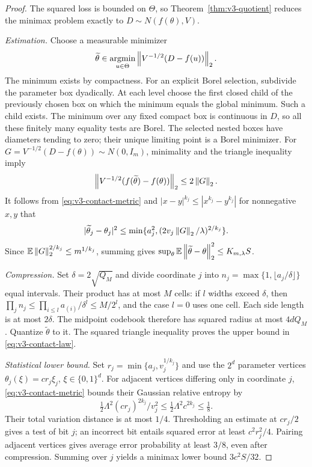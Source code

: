 \begin{proof}
The squared loss is bounded on $\Theta$, so
Theorem~\ref{thm:v3-quotient} reduces the minimax problem exactly to
$D\sim N(f(\theta),V)$.

\emph{Estimation.} Choose a measurable minimizer
\[
 \widetilde\theta\in\operatorname*{argmin}_{u\in\Theta}
          \left\lVert V^{-1/2}(D-f(u))\right\rVert_2.
\]
The minimum exists by compactness. For an explicit Borel selection,
subdivide the parameter box dyadically. At each level choose the first
closed child of the previously chosen box on which the minimum equals
the global minimum. Such a child exists. The minimum over any fixed
compact box is continuous in $D$, so all these finitely many equality
tests are Borel. The selected nested boxes have diameters tending to zero;
their unique limiting point is a Borel minimizer. For $G=V^{-1/2}(D-f(\theta))\sim N(0,I_m)$,
minimality and the triangle inequality imply
\[
 \left\lVert V^{-1/2}(f(\widetilde\theta)-f(\theta))\right\rVert_2\le2\left\lVert G\right\rVert_2.
\]
It follows from \eqref{eq:v3-contact-metric} and
$|x-y|^{k_j}\le|x^{k_j}-y^{k_j}|$ for nonnegative $x,y$ that
\[
 |\widetilde\theta_j-\theta_j|^2
 \le\min\{a_j^2,(2v_j\left\lVert G\right\rVert_2/\lambda)^{2/k_j}\}.
\]
Since $\mathbb E\left\lVert G\right\rVert_2^{2/k_j}\le m^{1/k_j}$, summing gives
$\sup_\theta\mathbb E\left\lVert \widetilde\theta-\theta\right\rVert_2^2
\le K_{m,\lambda}S$.

\emph{Compression.} Set $\delta=2\sqrt{Q_M}$ and divide coordinate
$j$ into $n_j=\max\{1,\lfloor a_j/\delta\rfloor\}$ equal intervals.
Their product has at most $M$ cells: if $l$ widths exceed $\delta$,
then $\prod_j n_j\le\prod_{i\le l}a_{(i)}/\delta^l\le M/2^l$,
and the case $l=0$ uses one cell. Each side length is at most $2\delta$.
The midpoint codebook therefore has squared radius at most $4dQ_M$.
Quantize $\widetilde\theta$ to it. The squared triangle inequality
proves the upper bound in \eqref{eq:v3-contact-law}.

\emph{Statistical lower bound.} Set
$r_j=\min\{a_j,v_j^{1/k_j}\}$ and use the $2^d$ parameter vertices
$\theta_j(\xi)=cr_j\xi_j$, $\xi\in\{0,1\}^d$.
For adjacent vertices differing only in coordinate $j$,
\eqref{eq:v3-contact-metric} bounds their Gaussian relative entropy by
\[
 \tfrac12\Lambda^2(cr_j)^{2k_j}/v_j^2
       \le\tfrac12\Lambda^2c^{2k_j}\le\tfrac18.
\]
Their total variation distance is at most $1/4$. Thresholding an estimate
at $cr_j/2$ gives a test of bit $j$; an incorrect bit entails squared
error at least $c^2r_j^2/4$. Pairing adjacent vertices gives average
error probability at least $3/8$, even after compression. Summing over
$j$ yields a minimax lower bound $3c^2S/32$.


\end{proof}
